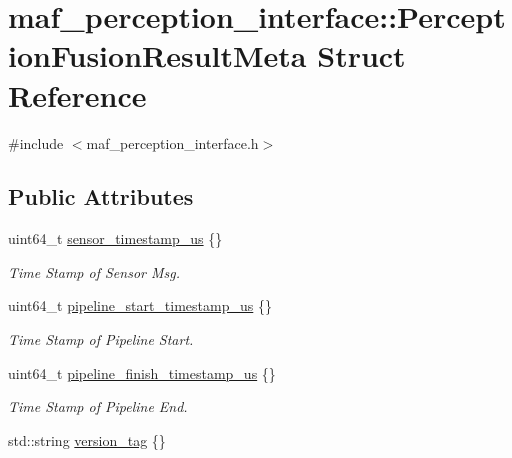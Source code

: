 \hypertarget{structmaf__perception__interface_1_1PerceptionFusionResultMeta}{}\section{maf\+\_\+perception\+\_\+interface\+:\+:Perception\+Fusion\+Result\+Meta Struct Reference}
\label{structmaf__perception__interface_1_1PerceptionFusionResultMeta}


{\ttfamily \#include $<$maf\+\_\+perception\+\_\+interface.\+h$>$}

\subsection*{Public Attributes}
\begin{DoxyCompactItemize}
\item 
uint64\+\_\+t \hyperlink{structmaf__perception__interface_1_1PerceptionFusionResultMeta_a167ca2dbe409186d406e232467335942}{sensor\+\_\+timestamp\+\_\+us} \{\}
\begin{DoxyCompactList}\small\item\em Time Stamp of Sensor Msg. \end{DoxyCompactList}\item 
uint64\+\_\+t \hyperlink{structmaf__perception__interface_1_1PerceptionFusionResultMeta_a0151b05138ed056d49e0e0c3aee620b1}{pipeline\+\_\+start\+\_\+timestamp\+\_\+us} \{\}
\begin{DoxyCompactList}\small\item\em Time Stamp of Pipeline Start. \end{DoxyCompactList}\item 
uint64\+\_\+t \hyperlink{structmaf__perception__interface_1_1PerceptionFusionResultMeta_af88d5f8a90f97e8fe8fffc1718b24f6b}{pipeline\+\_\+finish\+\_\+timestamp\+\_\+us} \{\}
\begin{DoxyCompactList}\small\item\em Time Stamp of Pipeline End. \end{DoxyCompactList}\item 
std\+::string \hyperlink{structmaf__perception__interface_1_1PerceptionFusionResultMeta_a9fb9b2eac69134def215d9281113c98e}{version\+\_\+tag} \{\}
\end{DoxyCompactItemize}


